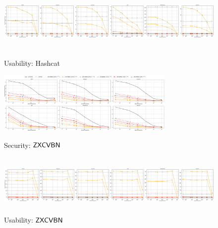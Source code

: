 \begin{figure}
		\includegraphics[width=\linewidth, height = 3cm]{Figures/Experiments/Utility/UsabilityHashcat}
		\vspace{-0.2in}
	\caption[Usability: Hashcat Estimator]{Usability: Hashcat}
		\label{fig:usabilityhashcat}
	\includegraphics[width=\linewidth, height = 3cm]{Figures/Experiments/Attacker/SecurityZxcvbn}
\vspace{-0.2in}
\caption[Security: $\ZXCVBN$ Estimator]{Security: $\ZXCVBN$}
\label{fig:securityzxcvbn}
\includegraphics[width=\linewidth, height = 3cm]{Figures/Experiments/Utility/UsabilityZxcvbn}
\vspace{-0.2in}
\caption[Security: $\ZXCVBN$ Estimator]{Usability: $\ZXCVBN$}
\label{fig:usabilityzxcvbn}
\end{figure}


	
	
